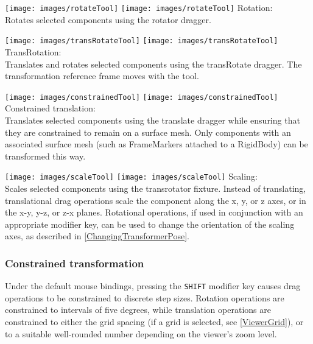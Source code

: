 \documentclass{article}
\begin{document}
\vspace{\parskip}
\iflatexml
\phantom{.}\texttt{[image: images/rotateTool]}
\else
\texttt{[image: images/rotateTool]}
\fi
{\sf Rotation:}\\
Rotates selected components using the rotator dragger.

\vspace{\parskip}
\iflatexml
\phantom{.}\texttt{[image: images/transRotateTool]}
\else
\texttt{[image: images/transRotateTool]}
\fi
{\sf TransRotation:}\\
Translates and rotates selected components
using the transRotate dragger. The transformation reference frame
moves with the tool.

\vspace{\parskip}
\iflatexml
\phantom{.}\texttt{[image: images/constrainedTool]}
\else
\texttt{[image: images/constrainedTool]}
\fi 
{\sf Constrained translation:}\\
Translates selected components using the translate dragger while ensuring that
they are constrained to remain on a surface mesh. Only components with
an associated surface mesh (such as FrameMarkers attached to a
RigidBody) can be transformed this way.

\vspace{\parskip}
\iflatexml
\phantom{.}\texttt{[image: images/scaleTool]}
\else
\texttt{[image: images/scaleTool]}
\fi
{\sf Scaling:}\\
Scales selected components using the transrotator
fixture. Instead of translating, translational drag operations
scale the component along the x, y, or z axes, or in the
x-y, y-z, or z-x planes. Rotational operations, if
used in conjunction with an appropriate modifier key,
can be used to change the orientation of the scaling axes,
as described in \ref{ChangingTransformerPose}.


\subsubsection{Constrained transformation}

Under the default mouse bindings, pressing the {\tt SHIFT} modifier
key causes drag operations to be constrained to discrete step sizes.
Rotation operations are constrained to
intervals of five degrees, while translation operations are
constrained to either the grid spacing (if a grid is selected, see
\ref{ViewerGrid}), or to a suitable well-rounded number depending on
the viewer's zoom level.
\end{document}
